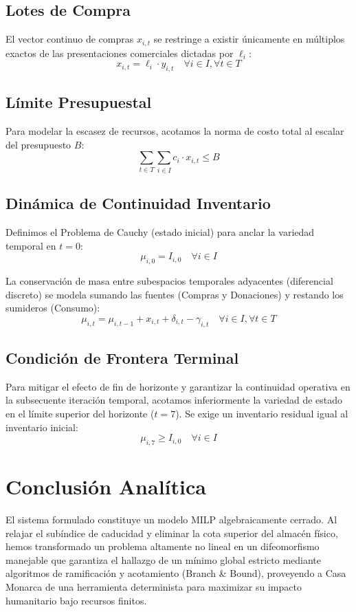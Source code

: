 \documentclass[12pt, a4paper]{article}
\begin{document}
\subsection{Lotes de Compra}
El vector continuo de compras $x_{i,t}$ se restringe a existir únicamente en múltiplos exactos de las presentaciones comerciales dictadas por $\ell_i$:
\begin{equation}
    x_{i,t} = \ell_i \cdot y_{i,t} \quad \forall i \in I, \forall t \in T
\end{equation}

\subsection{Límite Presupuestal}
Para modelar la escasez de recursos, acotamos la norma de costo total al escalar del presupuesto $B$:
\begin{equation}
    \sum_{t \in T} \sum_{i \in I} c_i \cdot x_{i,t} \le B
\end{equation}

\subsection{Dinámica de Continuidad Inventario}
Definimos el Problema de Cauchy (estado inicial) para anclar la variedad temporal en $t=0$:
\begin{equation}
    \mu_{i,0} = I_{i,0} \quad \forall i \in I
\end{equation}

La conservación de masa entre subespacios temporales adyacentes (diferencial discreto) se modela sumando las fuentes (Compras y Donaciones) y restando los sumideros (Consumo):
\begin{equation}
    \mu_{i,t} = \mu_{i,t-1} + x_{i,t} + \delta_{i,t} - \gamma_{i,t} \quad \forall i \in I, \forall t \in T
\end{equation}

\subsection{Condición de Frontera Terminal}
Para mitigar el efecto de fin de horizonte y garantizar la continuidad operativa en la subsecuente iteración temporal, acotamos inferiormente la variedad de estado en el límite superior del horizonte ($t=7$). Se exige un inventario residual igual al inventario inicial:
\begin{equation}
    \mu_{i,7} \ge I_{i,0} \quad \forall i \in I
\end{equation}

\section{Conclusión Analítica}
El sistema formulado constituye un modelo MILP algebraicamente cerrado. Al relajar el subíndice de caducidad y eliminar la cota superior del almacén físico, hemos transformado un problema altamente no lineal en un difeomorfismo manejable que garantiza el hallazgo de un mínimo global estricto mediante algoritmos de ramificación y acotamiento (Branch \& Bound), proveyendo a Casa Monarca de una herramienta determinista para maximizar su impacto humanitario bajo recursos finitos.
\end{document}
